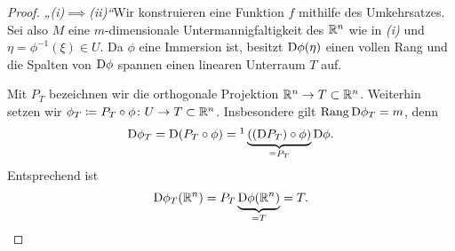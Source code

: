 \documentclass[skript.tex]{subfiles}
\begin{document}
	\begin{proof}
		\emph{„(i)$\implies$(ii)“}\quad Wir konstruieren eine Funktion $f$ mithilfe des Umkehrsatzes.\\
		Sei also $M$ eine $m$-dimensionale Untermannigfaltigkeit des $\mathbb{R}^n$ wie in \emph{(i)} und \\
		$\eta = \phi^{-1}(\xi) \in U$. Da $\phi$ eine Immersion ist, besitzt $\mathrm{D} \phi(\eta)$ einen vollen Rang und die Spalten von $\mathrm{D}\phi$ spannen einen linearen Unterraum $T$ auf.
		\begin{center}
		\end{center}
		Mit $P_T$ bezeichnen wir die orthogonale Projektion $\mathbb{R}^n \to T\subset\mathbb{R}^n$. Weiterhin setzen wir $\phi_T \coloneqq P_T \circ \phi \colon U \to T \subset \mathbb{R}^n$. Insbesondere gilt $\operatorname{Rang} \mathrm{D}\phi_T = m$, denn
		\[
			\diff\phi_T = \diff(P_T \circ \phi) =\footnotemark \underbrace{((\diff P_T)\circ\phi)}_{= P_T} \diff\phi.
		\]
		Entsprechend ist
		\[
			\mathrm{D}\phi_T(\mathbb{R}^n) = P_T\underbrace{\mathrm{D}\phi(\mathbb{R}^n)}_{= T}=T.
		\]
	\end{proof}
\end{document}
